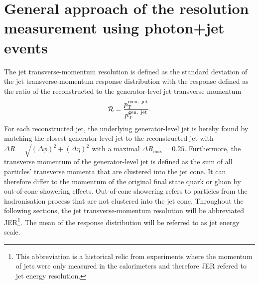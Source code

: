 \FloatBarrier
\chapter{General approach of the resolution measurement using photon+jet events}
\label{res:ch:GeneralApproach}

The jet transverse-momentum resolution is defined as the standard deviation of the jet transverse-momentum response distribution with the response defined as the ratio of the reconstructed to the generator-level jet transverse momentum 
\begin{equation}\label{res:eq:responseFormula}
\mathcal{R} =  \frac{{p}_\mathrm{T}^{\text{reco. jet}}}{{p}_\mathrm{T}^{\text{gen. jet}}}.
\end{equation}
For each reconstructed jet, the underlying generator-level jet is hereby found by matching the closest generator-level jet to the reconstructed jet with $\Delta R = \sqrt{(\Delta \phi)^2 + (\Delta \eta)^2}$ with a maximal $\Delta R_{\text{max}}=0.25$.
Furthermore, the transverse momentum of the generator-level jet is defined as the sum of all particles' transverse momenta that are clustered into the jet cone.
It can therefore differ to the momentum of the original final state quark or gluon by out-of-cone showering effects.
Out-of-cone showering refers to particles from the hadronisation process that are not clustered into the jet cone.
Throughout the following sections, the jet transverse-momentum resolution will be abbreviated JER\footnote{This abbreviation is a historical relic from experiments where the momentum of jets were only measured in the calorimeters and therefore JER refered to jet energy resolution.}.
The mean of the response distribution will be referred to as jet energy scale.


